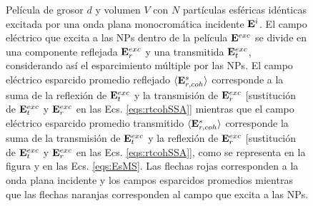 \begin{figure}[h!]
		\caption{ Película de grosor $d$ y volumen $V$ con $N$ partículas esféricas idénticas excitada por una onda plana monocromática incidente $\vb{E}^i$. El campo eléctrico que excita a las NPs dentro de la película $\vb{E}^{exc}$ se divide en una componente reflejada $ \vb{E}^{exc}_r$ y una transmitida $ \vb{E}^{exc}_t$, considerando así el esparcimiento múltiple por las NPs. El campo eléctrico esparcido promedio reflejado $\langle \vb{E}^s_{r,coh}\rangle$ corresponde a la suma de la reflexión de $\vb{E}^{exc}_t$ y la transmisión de $\vb{E}^{exc}_r$ [sustitución de $\vb{E}^{exc}_t$ y $\vb{E}^{exc}_r$ en las Ecs. \eqref{eqs:rtcohSSA}] mientras que el  campo eléctrico esparcido promedio transmitido $\langle \vb{E}^s_{r,coh}\rangle$ corresponde  la suma de la transmisión de $\vb{E}^{exc}_t$ y la reflexión de $\vb{E}^{exc}_r$ [sustitución de $\vb{E}^{exc}_t$ y $\vb{E}^{exc}_r$ en las Ecs. \eqref{eqs:rtcohSSA}], como se representa en la figura y en las Ecs. \eqref{eqs:EsMS}. Las flechas rojas corresponden a la onda plana incidente y los campos esparcidos promedios mientras que las flechas naranjas corresponden al campo que excita a las NPs. }\label{fig:MScatt-slab-MS}
	\end{figure}	
	
